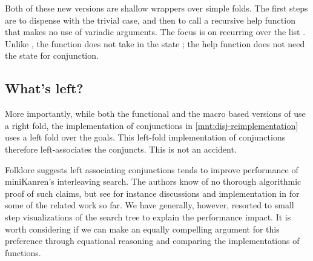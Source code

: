 \documentclass[runningheads,natbib=false]{llncs}
\begin{document}



Both of these new versions are shallow wrappers over simple folds. The
first steps are to dispense with the trivial case, and then to call a
recursive help function that makes no use of variadic arguments. The
focus is on recurring over the list . Unlike
, the function  does not take in the state
; the help function does not need the state for
conjunction.

\subsection{What's left?}\label{sec:whats-left}

More importantly, while both the functional and the macro based
versions of  use a right fold, the implementation of
conjunctions in \cref{mnt:disj-reimplementation} uses a left fold over
the goals. This left-fold implementation of conjunctions therefore
left-associates the conjuncts. This is not an accident.

%
Folklore suggests left associating conjunctions tends to improve
performance of miniKanren's interleaving search. The authors know of
no thorough algorithmic proof of such claims, but see for instance
discussions and implementation in
\citet{rosenblatt2019first} for some of
the related work so far. We have generally, however, resorted to small
step visualizations of the search tree to explain the performance
impact. It is worth considering if we can make an equally compelling
argument for this preference through equational reasoning and
comparing the implementations of functions.


\end{document}
